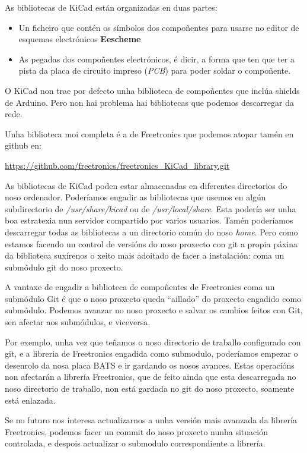 \documentclass[12pt,galician,]{article}
\begin{document}
As bibliotecas de KiCad están organizadas en duas partes:

\begin{itemize}
\item
  Un ficheiro que contén os símbolos dos compoñentes para usarse no
  editor de esquemas electrónicos \textbf{Eescheme}
\item
  As pegadas dos compoñentes electrónicos, é dicir, a forma que ten que
  ter a pista da placa de circuito impreso (\emph{PCB}) para poder
  soldar o compoñente.
\end{itemize}

O KiCad non trae por defecto unha biblioteca de compoñentes que inclúa
shields de Arduino. Pero non hai problema hai bibliotecas que podemos
descarregar da rede.

Unha biblioteca moi completa é a de Freetronics que podemos atopar tamén
en github en:

\url{https://github.com/freetronics/freetronics_KiCad_library.git}

As bibliotecas de KiCad poden estar almacenadas en diferentes
directorios do noso ordenador. Poderíamos engadir as bibliotecas que
usemos en algún subdirectorio de \emph{/usr/share/kicad} ou de
\emph{/usr/local/share}. Esta podería ser unha boa estratexia nun
servidor compartido por varios usuarios. Tamén poderíamos descarregar
todas as bibliotecas a un directorio común do noso \emph{home}. Pero
como estamos facendo un control de versións do noso proxecto con git a
propia páxina da biblioteca suxírenos o xeito mais adoitado de facer a
instalación: coma un submódulo git do noso proxecto.

A vantaxe de engadir a biblioteca de compoñentes de Freetronics coma un
submódulo Git é que o noso proxecto queda ``aillado'' do proxecto
engadido como submódulo. Podemos avanzar no noso proxecto e salvar os
cambios feitos con Git, sen afectar aos submódulos, e viceversa.

Por exemplo, unha vez que teñamos o noso directorio de traballo
configurado con git, e a libreria de Freetronics engadida como
submodulo, poderíamos empezar o desenrolo da nosa placa BATS e ir
gardando os nosos avances. Estas operacións non afectarán a librería
Freetronics, que de feito ainda que esta descarregada no noso directorio
de traballo, non está gardada no git do noso proxecto, soamente está
enlazada.

Se no futuro nos interesa actualizarnos a unha versión mais avanzada da
librería Freetronics, podemos facer un commit do noso proxecto nunha
situación controlada, e despois actualizar o submodulo correspondiente a
librería.
\end{document}
